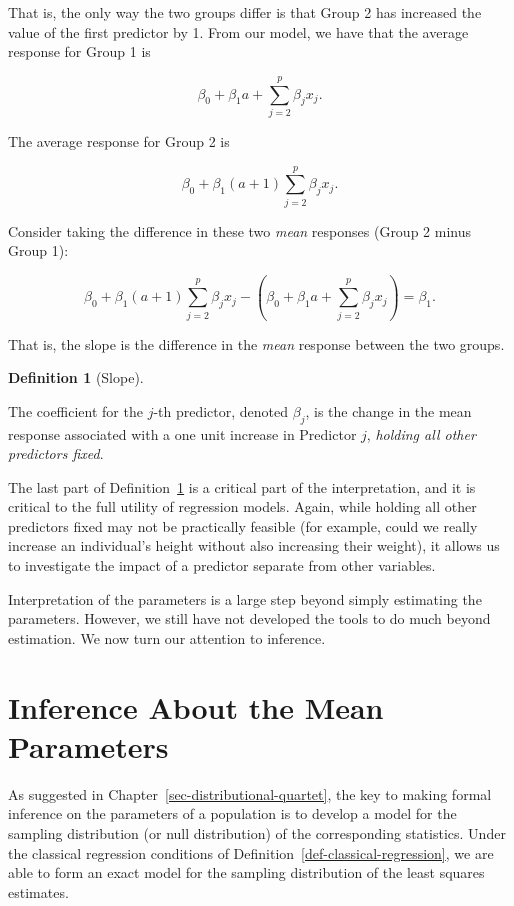 \documentclass[
  letterpaper,
  DIV=11,
  numbers=noendperiod]{scrreprt}
\theoremstyle{definition}
\theoremstyle{definition}
\newtheorem{definition}{Definition}[chapter]
\theoremstyle{remark}
\begin{document}
That is, the only way the two groups differ is that Group 2 has
increased the value of the first predictor by 1. From our model, we have
that the average response for Group 1 is

\[\beta_0 + \beta_1 a + \sum_{j=2}^{p} \beta_j x_j.\]

The average response for Group 2 is

\[\beta_0 + \beta_1 (a + 1) \sum_{j=2}^{p} \beta_j x_j.\]

Consider taking the difference in these two \emph{mean} responses (Group
2 minus Group 1):

\[\beta_0 + \beta_1 (a + 1) \sum_{j=2}^{p} \beta_j x_j - \left(\beta_0 + \beta_1 a + \sum_{j=2}^{p} \beta_j x_j\right) = \beta_1.\]

That is, the slope is the difference in the \emph{mean} response between
the two groups.

\begin{definition}[Slope]\protect\hypertarget{def-slope}{}\label{def-slope}

The coefficient for the \(j\)-th predictor, denoted \(\beta_j\), is the
change in the mean response associated with a one unit increase in
Predictor \(j\), \emph{holding all other predictors fixed}.

\end{definition}

The last part of Definition~\ref{def-slope} is a critical part of the
interpretation, and it is critical to the full utility of regression
models. Again, while holding all other predictors fixed may not be
practically feasible (for example, could we really increase an
individual's height without also increasing their weight), it allows us
to investigate the impact of a predictor separate from other variables.

Interpretation of the parameters is a large step beyond simply
estimating the parameters. However, we still have not developed the
tools to do much beyond estimation. We now turn our attention to
inference.

\hypertarget{inference-about-the-mean-parameters}{%
\section{Inference About the Mean
Parameters}\label{inference-about-the-mean-parameters}}

As suggested in Chapter~\ref{sec-distributional-quartet}, the key to
making formal inference on the parameters of a population is to develop
a model for the sampling distribution (or null distribution) of the
corresponding statistics. Under the classical regression conditions of
Definition~\ref{def-classical-regression}, we are able to form an exact
model for the sampling distribution of the least squares estimates.
\end{document}

